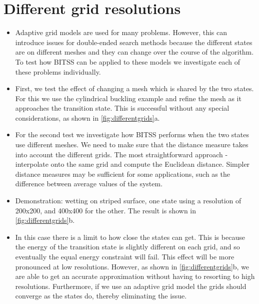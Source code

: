 \documentclass[aps,twocolumn]{revtex4}
\begin{document}
\section{Different grid resolutions}
\begin{itemize}
\item
Adaptive grid models are used for many problems. However, this can introduce issues for double-ended search methods because the different states are on different meshes and they can change over the course of the algorithm.
To test how BITSS can be applied to these models we investigate each of these problems individually.
\item
First, we test the effect of changing a mesh which is shared by the two states.
For this we use the cylindrical buckling example and refine the mesh as it approaches the transition state.
This is successful without any special considerations, as shown in \cref{fig:differentgrids}a.
\item
For the second test we investigate how BITSS performs when the two states use different meshes.
We need to make sure that the distance measure takes into account the different grids.
The most straightforward approach - interpolate onto the same grid and compute the Euclidean distance.
Simpler distance measures may be sufficient for some applications, such as the difference between average values of the system.
\item
Demonstration: wetting on striped surface, one state using a resolution of 200x200, and 400x400 for the other. The result is shown in \cref{fig:differentgrids}b.
\item
In this case there is a limit to how close the states can get. This is because the energy of the transition state is slightly different on each grid, and so eventually the equal energy constraint will fail. This effect will be more pronounced at low resolutions. However, as shown in \cref{fig:differentgrids}b, we are able to get an accurate approximation without having to resorting to high resolutions. Furthermore, if we use an adaptive grid model the grids should converge as the states do, thereby eliminating the issue.
\end{itemize}
\end{document}
